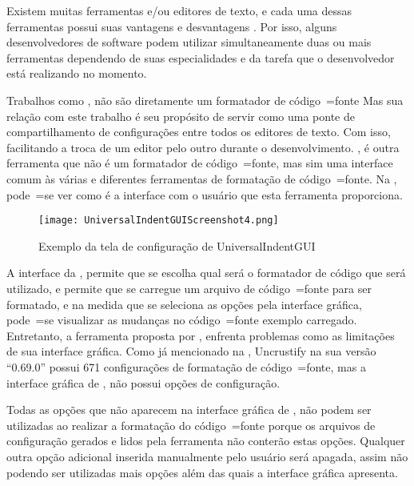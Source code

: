 Existem muitas ferramentas e\slash{}ou editores de texto,
e cada uma dessas ferramentas possui suas vantagens e
desvantagens \cite{prettyPrintingOfVisualSentences,anAbstractPrettyPrinter,improvingRefactoringSpeed}.
Por isso,
alguns desenvolvedores de software podem utilizar simultaneamente duas ou
mais ferramentas dependendo de suas especialidades e
da tarefa que o desenvolvedor está realizando no momento.

Trabalhos como ,
não são diretamente um formatador de código~=fonte Mas sua relação com este trabalho é seu propósito de servir como uma ponte de compartilhamento de configurações entre todos os editores de texto.
Com isso,
facilitando a troca de um editor pelo outro durante o desenvolvimento.
,
é outra ferramenta que não é um formatador de código~=fonte,
mas sim uma interface comum às várias e
diferentes ferramentas de formatação de código~=fonte.
Na ,
pode~=se ver como é a interface com o usuário que esta ferramenta proporciona.

\begin{figure}[!htb]
\caption{Exemplo da tela de configuração de UniversalIndentGUI}
\label{UniversalIndentGUIScreenshot4}
\centering
\texttt{[image: UniversalIndentGUIScreenshot4.png]}
\end{figure}

A interface da ,
permite que se escolha qual será o formatador de código que será utilizado,
e permite que se carregue um arquivo de código~=fonte para ser formatado,
e na medida que se seleciona as opções pela interface gráfica,
pode~=se visualizar as mudanças no código~=fonte exemplo carregado.
Entretanto,
a ferramenta proposta por ,
enfrenta problemas como as limitações de sua interface gráfica.
Como já mencionado na ,
Uncrustify na sua versão ``0.69.0'' possui 671 configurações de formatação de código~=fonte,
mas a interface gráfica de ,
não possui  opções de configuração.

Todas as opções que não aparecem na interface gráfica de ,
não podem ser utilizadas ao realizar a formatação do código~=fonte porque os arquivos de configuração gerados e
lidos pela ferramenta não conterão estas opções.
Qualquer outra opção adicional inserida manualmente pelo usuário será apagada,
assim não podendo ser utilizadas mais opções além das quais a interface gráfica apresenta.

